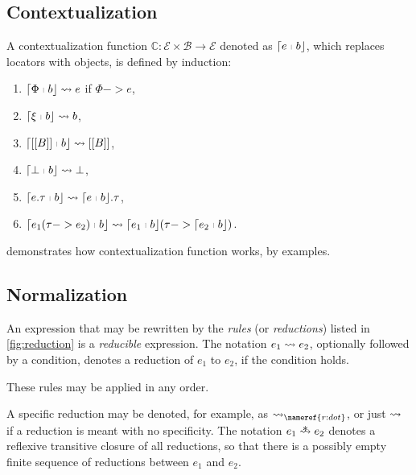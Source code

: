 \newpage
\subsection{Contextualization}\label{sec:contextualization}
\newcommand\ctx[2]{\lceil #1 \;\textcolor{gray}{\shortmid}\; #2 \rfloor}

\begin{definition}[Contextualization]
A contextualization function \(\mathbb{C} : \mathcal{E} \times \mathcal{B} \to \mathcal{E}\) denoted as \( \ctx{e}{b} \), which replaces locators with objects, is defined by induction:
\begin{enumerate}[label=\(\mathbb{C}_\arabic*:\),ref=\ensuremath{\mathbb{C}.\arabic*}]
  \item\label{C:Phi} $ \ctx{\Phi}{b} \trans e $ \quad if $ \Phi -> e $,
  \item\label{C:xi} $ \ctx{\xi}{b} \trans b $,
  \item\label{C:forma} $ \ctx{[[ B ]]}{b} \trans [[ B ]] $,
  \item\label{C:dead} $ \ctx{\dead}{b} \trans \dead $,
  \item\label{C:dot} $ \ctx{e.\tau}{b} \trans \ctx{e}{b}.\tau $,
  \item\label{C:app} $ \ctx{e_1( \tau -> e_2 )}{b} \trans \ctx{e_1}{b}( \tau -> \ctx{e_2}{b} ) $.
\end{enumerate}
\end{definition}

 demonstrates how contextualization function works, by examples.

\subsection{Normalization}\label{sec:normalization}

An expression that may be rewritten by the \emph{rules} (or \emph{reductions})
listed in \cref{fig:reduction} is a \emph{reducible} expression.
The notation \(e_1 \mathrel{\leadsto} e_2\), optionally followed by a condition,
denotes a reduction of \(e_1\) to \(e_2\), if the condition holds.

These rules may be applied in any order.

A specific reduction may be denoted, for example, as \(\trans_{\nameref{r:dot}}\),
or just \(\mathrel{\leadsto}\) if a reduction is meant with no specificity.
The notation \(e_1 \strans e_2\) denotes a reflexive transitive
closure of all reductions, so that there is a possibly empty finite
sequence of reductions between \(e_1\) and \(e_2\).


